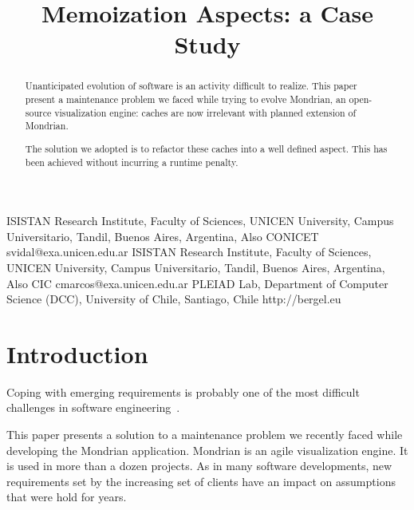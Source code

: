 \documentclass[preprint,10pt]{sigplanconf}
\newcommand{\seclabel}[1]{\label{sec:#1}}
\begin{document}

\title{Memoization Aspects: a Case Study}

	{ISISTAN Research Institute, Faculty of Sciences, UNICEN University, Campus Universitario, Tandil, Buenos Aires, Argentina, Also CONICET}
	{svidal@exa.unicen.edu.ar}
	{ISISTAN Research Institute, Faculty of Sciences, UNICEN University, Campus Universitario, Tandil, Buenos Aires, Argentina, Also CIC}
	{cmarcos@exa.unicen.edu.ar}
	{PLEIAD Lab, Department of Computer Science (DCC), University of Chile, Santiago, Chile}
	{http://bergel.eu}


\maketitle


\begin{abstract}
Unanticipated evolution of software is an activity difficult to realize. This paper present a maintenance problem we faced while trying to evolve Mondrian, an open-source visualization engine: caches are now irrelevant with planned extension of Mondrian.

The solution we adopted is to refactor these caches into a well defined aspect. This has been achieved without incurring a runtime penalty.
\end{abstract}

\section{Introduction}\seclabel{introduction}

Coping with emerging requirements is probably one of the most difficult challenges in software engineering~\cite{Somm00a}. 

This paper presents a solution to a maintenance problem we recently faced while developing the Mondrian application.
Mondrian is an agile visualization engine. It is used in more than a dozen projects. As in many software developments, new requirements set by the increasing set of clients have an impact on assumptions that were hold for years. 
\end{document}
